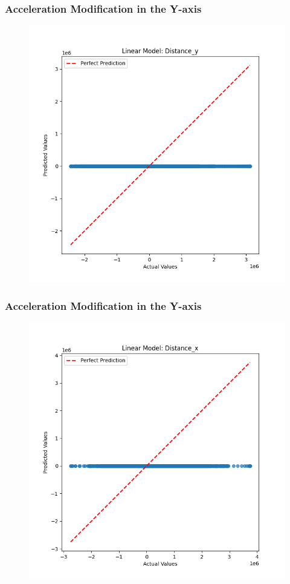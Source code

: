 
\begin{frame}
\end{frame}


\begin{frame}
\end{frame}


\begin{frame}
\end{frame}


\begin{frame}
\end{frame}


\begin{frame}
\end{frame}


\begin{frame}
  \frametitle{Acceleration Modification in the Y-axis}
  \begin{figure}
    \centering
    \includegraphics[width=0.5 \textwidth]{figures/acceleration_mod/acceleration_mod_dist_y.png}
  \end{figure}
\end{frame}


\begin{frame}
  \frametitle{Acceleration Modification in the Y-axis}
  \begin{figure}
    \centering
    \includegraphics[width=0.5 \textwidth]{figures/acceleration_mod/acceleration_mod_dist_x.png}
  \end{figure}
\end{frame}


